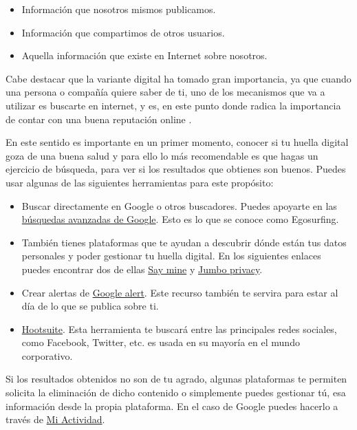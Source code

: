 \documentclass[
  a4paper,
  openany]{book}
\begin{document}
\begin{itemize}
\item
  Información que nosotros mismos publicamos.
\item
  Información que compartimos de otros usuarios.
\item
  Aquella información que existe en Internet sobre nosotros.
\end{itemize}

Cabe destacar que la variante digital ha tomado gran importancia, ya que cuando una persona o compañía quiere saber de ti, uno de los mecanismos que va a utilizar es buscarte en internet, y es, en este punto donde radica la importancia de contar con una buena reputación online \citep{huella-digital}.

En este sentido es importante en un primer momento, conocer si tu huella digital goza de una buena salud y para ello lo más recomendable es que hagas un ejercicio de búsqueda, para ver si los resultados que obtienes son buenos. Puedes usar algunas de las siguientes herramientas para este propósito:

\begin{itemize}
\item
  Buscar directamente en Google o otros buscadores. Puedes apoyarte en las \href{https://support.google.com/websearch/answer/2466433?hl=es}{búsquedas avanzadas de Google}. Esto es lo que se conoce como Egosurfing.
\item
  También tienes plataformas que te ayudan a descubrir dónde están tus datos personales y poder gestionar tu huella digital. En los siguientes enlaces puedes encontrar dos de ellas \href{https://saymine.com/}{Say mine} y \href{https://www.jumboprivacy.com/}{Jumbo privacy}.
\item
  Crear alertas de \href{https://www.google.es/alerts}{Google alert}. Este recurso también te servira para estar al día de lo que se publica sobre ti.
\item
  \href{https://www.hootsuite.com/}{Hootsuite}. Esta herramienta te buscará entre las principales redes sociales, como Facebook, Twitter, etc. es usada en su mayoría en el mundo corporativo.
\end{itemize}

Si los resultados obtenidos no son de tu agrado, algunas plataformas te permiten solicita la eliminación de dicho contenido o simplemente puedes gestionar tú, esa información desde la propia plataforma. En el caso de Google puedes hacerlo a través de \href{https://myactivity.google.com/myactivity}{Mi Actividad}.
\end{document}
